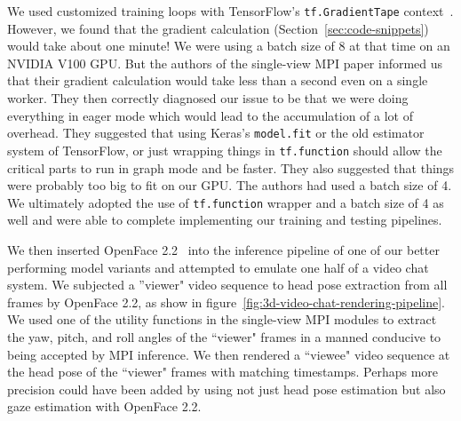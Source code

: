 We used customized training loops with TensorFlow's \texttt{tf.GradientTape} context~\cite{noauthor_custom_nodate}. However, we found that the gradient calculation (Section~\ref{sec:code-snippets}) would take about one minute! We were using a batch size of 8 at that time on an NVIDIA V100 GPU. But the authors of the single-view MPI paper informed us that their gradient calculation would take less than a second even on a single worker. They then correctly diagnosed our issue to be that we were doing everything in eager mode which would lead to the accumulation of a lot of overhead. They suggested that using Keras's \texttt{model.fit} or the old estimator system of TensorFlow, or just wrapping things in \texttt{tf.function} should allow the critical parts to run in graph mode and be faster. They also suggested that things were probably too big to fit on our GPU. The authors had used a batch size of 4. We ultimately adopted the use of \texttt{tf.function} wrapper and a batch size of 4 as well and were able to complete implementing our training and testing pipelines.

We then inserted OpenFace 2.2~\cite{baltrusaitis_openface_2018} into the inference pipeline of one of our better performing model variants and attempted to emulate one half of a video chat system. We subjected a ''viewer" video sequence to head pose extraction from all frames by OpenFace 2.2, as show in figure~\ref{fig:3d-video-chat-rendering-pipeline}. We used one of the utility functions in the single-view MPI modules to extract the yaw, pitch, and roll angles of the ``viewer" frames in a manned conducive to being accepted by MPI inference. We then rendered a ``viewee" video sequence at the head pose of the ``viewer" frames with matching timestamps. Perhaps more precision could have been added by using not just head pose estimation but also gaze estimation with OpenFace 2.2.





